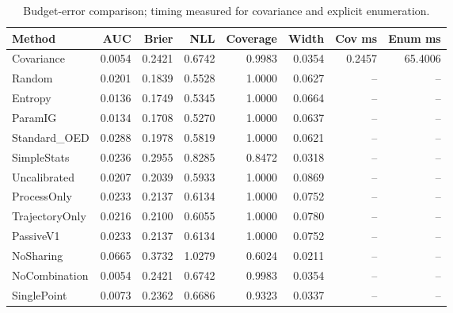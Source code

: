 \begin{table}[t]
\caption{Budget-error comparison; timing measured for covariance and explicit enumeration.}
\label{tab:experiment2}
\begin{tabular}{lrrrrrrr}
\toprule
Method & AUC & Brier & NLL & Coverage & Width & Cov ms & Enum ms \\
\midrule
Covariance & 0.0054 & 0.2421 & 0.6742 & 0.9983 & 0.0354 & 0.2457 & 65.4006 \\
Random & 0.0201 & 0.1839 & 0.5528 & 1.0000 & 0.0627 & -- & -- \\
Entropy & 0.0136 & 0.1749 & 0.5345 & 1.0000 & 0.0664 & -- & -- \\
ParamIG & 0.0134 & 0.1708 & 0.5270 & 1.0000 & 0.0637 & -- & -- \\
Standard\_OED & 0.0288 & 0.1978 & 0.5819 & 1.0000 & 0.0621 & -- & -- \\
SimpleStats & 0.0236 & 0.2955 & 0.8285 & 0.8472 & 0.0318 & -- & -- \\
Uncalibrated & 0.0207 & 0.2039 & 0.5933 & 1.0000 & 0.0869 & -- & -- \\
ProcessOnly & 0.0233 & 0.2137 & 0.6134 & 1.0000 & 0.0752 & -- & -- \\
TrajectoryOnly & 0.0216 & 0.2100 & 0.6055 & 1.0000 & 0.0780 & -- & -- \\
PassiveV1 & 0.0233 & 0.2137 & 0.6134 & 1.0000 & 0.0752 & -- & -- \\
NoSharing & 0.0665 & 0.3732 & 1.0279 & 0.6024 & 0.0211 & -- & -- \\
NoCombination & 0.0054 & 0.2421 & 0.6742 & 0.9983 & 0.0354 & -- & -- \\
SinglePoint & 0.0073 & 0.2362 & 0.6686 & 0.9323 & 0.0337 & -- & -- \\
\bottomrule
\end{tabular}
\end{table}
